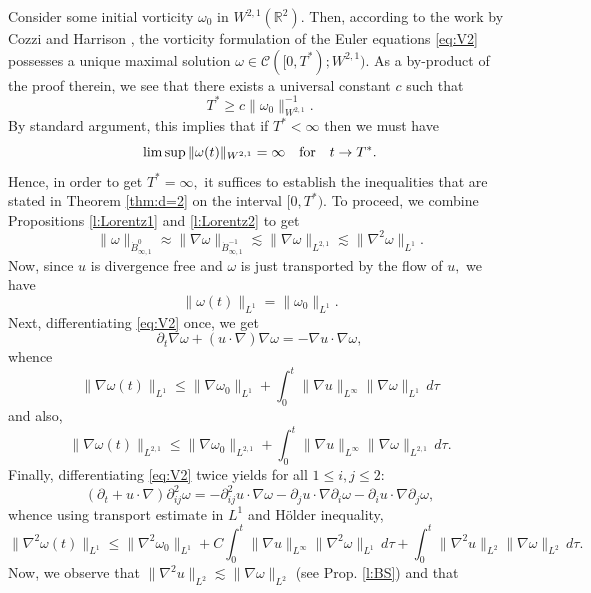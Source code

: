 \documentclass[11pt]{amsart}
\newcommand{\R}{{\mathbb R}}
\def\cC{{\mathcal C}}
\numberwithin{equation}{section}
\def\d{\partial}
\begin{document}
Consider some initial vorticity $\omega_0$ in $W^{2,1}(\R^2).$  Then, according to  the work by Cozzi and Harrison
\cite{CH}, 
the vorticity formulation of the Euler equations \eqref{eq:V2} possesses a unique maximal 
solution $\omega\in\cC([0,T^*); W^{2,1}).$ As a by-product of the proof therein, we see 
that there exists a universal constant $c$ such that 
$$T^*\geq c\|\omega_0\|_{W^{2,1}}^{-1}.$$  
By standard argument, this implies that if $T^*<\infty$ then we must have 
$$\limsup \|\omega(t)\|_{W^{2,1}}=\infty\quad\hbox{for}\quad t\to T^*.$$ 
Hence,  in order to get $T^*=\infty,$  it suffices to establish the inequalities
that are stated in Theorem \ref{thm:d=2}  on the interval $[0,T^*).$ 
\medbreak
To proceed, we combine  Propositions  \ref{l:Lorentz1} and \ref{l:Lorentz2}  to get
\begin{equation}\label{eq:keyineq}
\|\omega\|_{\dot B^0_{\infty,1}} \approx \|\nabla \omega\|_{\dot B^{-1}_{\infty,1}}
\lesssim \|\nabla\omega\|_{L^{2,1}}
\lesssim \|\nabla^2\omega\|_{L^1}.\end{equation}
Now, since $u$ is divergence free and $\omega$ is just transported by the flow of $u,$ we have
$$\|\omega(t)\|_{L^1}=\|\omega_0\|_{L^1}.$$
Next, differentiating \eqref{eq:V2} once, we get 
\begin{equation}\label{eq:d1}
\d_t\nabla \omega+(u\cdot\nabla)\nabla \omega=-\nabla u\cdot\nabla\omega,\end{equation}
whence
$$\|\nabla\omega(t)\|_{L^1} 
 \leq \|\nabla\omega_0\|_{L^1} +\int_0^t\|\nabla u\|_{L^\infty}\|\nabla\omega\|_{L^1}\,d\tau$$
 and also, 
 \begin{equation}\label{eq:W21}
 \|\nabla\omega(t)\|_{L^{2,1}} 
 \leq \|\nabla\omega_0\|_{L^{2,1}} +\int_0^t\|\nabla u\|_{L^\infty}\|\nabla\omega\|_{L^{2,1}}\,d\tau.
 \end{equation} 
 Finally,  differentiating \eqref{eq:V2} twice yields for all $1\leq i,j\leq2$:
 \begin{equation}\label{eq:d2}
 (\d_t+u\cdot\nabla)\d^2_{ij}\omega =-\d^2_{ij} u\cdot\nabla \omega-\d_ju\cdot\nabla\d_i\omega-\d_iu\cdot\nabla\d_j\omega,
 \end{equation}
 whence using transport estimate in $L^1$ and H\"older inequality, 
 $$
 \|\nabla^2\omega(t)\|_{L^1}\leq \|\nabla^2\omega_0\|_{L^1}+C\int_0^t\|\nabla u\|_{L^\infty}\|\nabla^2\omega\|_{L^1}\,d\tau
 +\int_0^t\|\nabla^2 u\|_{L^2}\|\nabla \omega\|_{L^2}\,d\tau.$$
 Now, we observe that $\|\nabla^2 u\|_{L^2}\lesssim \|\nabla \omega\|_{L^2}$ (see Prop. \ref{l:BS}) and that
\end{document}
